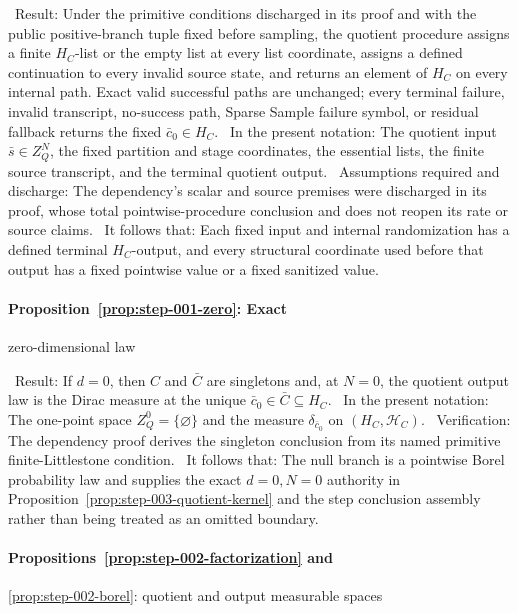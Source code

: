 \noindent\textbullet\ Result: Under the primitive conditions discharged in its 
  proof and with the public positive-branch tuple fixed before sampling, the
  quotient procedure assigns a finite \(H_C\)-list or the empty list at every
  list coordinate, assigns a defined continuation to every invalid source
  state, and returns an element of \(H_C\) on every internal path. Exact
  valid successful paths are unchanged; every terminal failure,
  invalid transcript, no-success path, Sparse Sample failure symbol, or
  residual fallback returns the fixed \(\bar c_0\in H_C\).
\noindent\textbullet\ In the present notation: The quotient input \(\bar s\in Z_Q^N\), the fixed
  partition and stage coordinates, the essential lists, the finite source
  transcript, and the terminal quotient output.
\noindent\textbullet\ Assumptions required and discharge: The dependency's scalar and source
  premises were discharged in its  proof, whose 
  total pointwise-procedure conclusion and does not reopen its rate or source
  claims.
\noindent\textbullet\ It follows that: Each fixed input and internal randomization has a defined
  terminal \(H_C\)-output, and every structural coordinate used before that
  output has a fixed pointwise value or a fixed sanitized value.

\paragraph{Proposition~\ref{prop:step-001-zero}: Exact}
zero-dimensional law

\noindent\textbullet\ Result: If \(d=0\), then \(C\) and \(\bar C\) are singletons and,
  at \(N=0\), the quotient output law is the Dirac measure at the unique
  \(\bar c_0\in\bar C\subseteq H_C\).
\noindent\textbullet\ In the present notation: The one-point space
  \(Z_Q^0=\{\varnothing\}\) and the measure \(\delta_{\bar c_0}\) on
  \((H_C,\mathcal H_C)\).
\noindent\textbullet\ Verification: The  dependency proof derives the singleton
  conclusion from its named primitive finite-Littlestone condition.
\noindent\textbullet\ It follows that: The null branch is a pointwise Borel probability law and
  supplies the exact \(d=0,N=0\) authority in
  Proposition~\ref{prop:step-003-quotient-kernel} and the step conclusion
  assembly rather than being treated as an omitted boundary.

\paragraph{Propositions~\ref{prop:step-002-factorization} and}
\ref{prop:step-002-borel}: quotient and output measurable spaces

